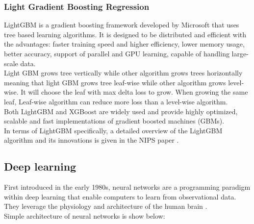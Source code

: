 \documentclass[english]{article}
\begin{document}
\subsubsection{Light Gradient Boosting Regression}
LightGBM is a gradient boosting framework developed by Microsoft that uses tree based learning algorithms. It is designed to be distributed and efficient with the advantages: faster training speed and higher efficiency, lower memory usage, better accuracy, support of parallel and GPU learning, capable of handling large-scale data.\cite{light}\\
Light GBM grows tree vertically while other algorithm grows trees horizontally meaning that light GBM grows tree leaf-wise while other algorithm grows level-wise. It will choose the leaf with max delta loss to grow. When growing the same leaf, Leaf-wise algorithm can reduce more loss than a level-wise algorithm.\\
Both LightGBM and XGBoost are widely used and provide highly optimized, scalable and fast implementations of gradient boosted machines (GBMs).\\
In terms of LightGBM specifically, a detailed overview of the LightGBM algorithm and its innovations is given in the NIPS paper \cite{light}.



\subsection{Deep learning}
First introduced in the early 1980s, neural networks are a programming paradigm within deep learning that enable computers to learn from observational data. They leverage the physiology and architecture of the human brain \cite{DO}.\\
Simple architecture of neural networks is show below:
\end{document}
